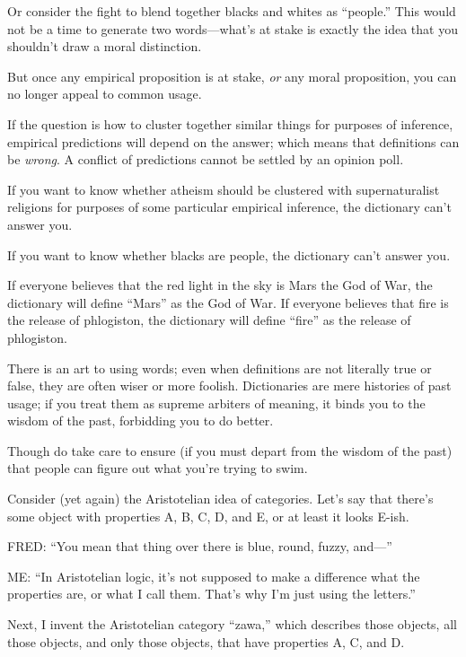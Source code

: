 {
 Or consider the fight to blend together blacks and whites as
``people.'' This would not be a time
to generate two words---what's at stake is exactly the
idea that you shouldn't draw a moral distinction.}

{
 But once any empirical proposition is at stake, \textit{or} any
moral proposition, you can no longer appeal to common usage.}

{
 If the question is how to cluster together similar things for
purposes of inference, empirical predictions will depend on the answer;
which means that definitions can be \textit{wrong}. A conflict of
predictions cannot be settled by an opinion poll.}

{
 If you want to know whether atheism should be clustered with
supernaturalist religions for purposes of some particular empirical
inference, the dictionary can't answer you.}

{
 If you want to know whether blacks are people, the dictionary
can't answer you.}

{
 If everyone believes that the red light in the sky is Mars the God
of War, the dictionary will define
``Mars'' as the God of War. If
everyone believes that fire is the release of phlogiston, the
dictionary will define ``fire'' as
the release of phlogiston.}

{
 There is an art to using words; even when definitions are not
literally true or false, they are often wiser or more foolish.
Dictionaries are mere histories of past usage; if you treat them as
supreme arbiters of meaning, it binds you to the wisdom of the past,
forbidding you to do better.}

{
 Though do take care to ensure (if you must depart from the wisdom
of the past) that people can figure out what you're
trying to swim.}

\myendsectiontext


{
 Consider (yet again) the Aristotelian idea of categories.
Let's say that there's some object with
properties A, B, C, D, and E, or at least it looks E-ish.}

{
 FRED: ``You mean that thing over there is blue,
round, fuzzy, and---''}

{
 ME: ``In Aristotelian logic, it's
not supposed to make a difference what the properties are, or what I
call them. That's why I'm just using
the letters.''}

{
 Next, I invent the Aristotelian category
``zawa,'' which describes those
objects, all those objects, and only those objects, that have
properties A, C, and D.}

